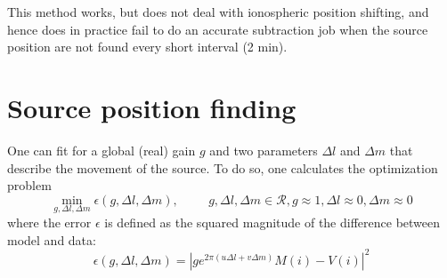 \documentclass[a4paper,11pt]{article}
\begin{document}
This method works, but does not deal with ionospheric position shifting, and hence does in practice fail to do an accurate subtraction job when the source position are not found every short interval (2 min).

\section{Source position finding}
One can fit for a global (real) gain $g$ and two parameters $\Delta l$ and $\Delta m$ that describe the movement of the source. To do so, one calculates the optimization problem
\begin{equation}
 \min_{g,\Delta l,\Delta m} \epsilon(g,\Delta l,\Delta m),\hspace{1cm} g,\Delta l,\Delta m \in \mathcal{R}, g\approx 1, \Delta l\approx 0, \Delta m\approx 0
\end{equation}
where the error $\epsilon$ is defined as the squared magnitude of the difference between model and data:
\begin{equation}
 \epsilon(g,\Delta l,\Delta m) = \left| g e^{2\pi \left( u\Delta l + v\Delta m\right)} M(i) - V(i) \right|^2
\end{equation}

\label{lastpage}
\end{document}
